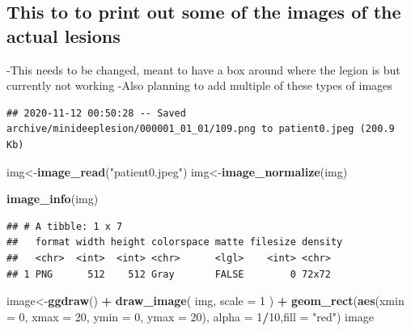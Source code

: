 \documentclass[12pt]{article}
\newenvironment{Shaded}{\begin{snugshade}}{\end{snugshade}}
\newcommand{\DataTypeTok}[1]{\textcolor[rgb]{0.13,0.29,0.53}{#1}}
\newcommand{\DecValTok}[1]{\textcolor[rgb]{0.00,0.00,0.81}{#1}}
\newcommand{\KeywordTok}[1]{\textcolor[rgb]{0.13,0.29,0.53}{\textbf{#1}}}
\newcommand{\NormalTok}[1]{#1}
\newcommand{\OperatorTok}[1]{\textcolor[rgb]{0.81,0.36,0.00}{\textbf{#1}}}
\newcommand{\OtherTok}[1]{\textcolor[rgb]{0.56,0.35,0.01}{#1}}
\newcommand{\StringTok}[1]{\textcolor[rgb]{0.31,0.60,0.02}{#1}}
\begin{document}
\hypertarget{this-to-to-print-out-some-of-the-images-of-the-actual-lesions}{%
\subsection{This to to print out some of the images of the actual
lesions}\label{this-to-to-print-out-some-of-the-images-of-the-actual-lesions}}

-This needs to be changed, meant to have a box around where the legion
is but currently not working -Also planning to add multiple of these
types of images

\begin{Shaded}
\end{Shaded}

\begin{verbatim}
## 2020-11-12 00:50:28 -- Saved archive/minideeplesion/000001_01_01/109.png to patient0.jpeg (200.9 Kb)
\end{verbatim}

\begin{Shaded}
\begin{Highlighting}[]
\NormalTok{img<-}\KeywordTok{image_read}\NormalTok{(}\StringTok{"patient0.jpeg"}\NormalTok{)}
\NormalTok{img<-}\KeywordTok{image_normalize}\NormalTok{(img)}

\KeywordTok{image_info}\NormalTok{(img)}
\end{Highlighting}
\end{Shaded}

\begin{verbatim}
## # A tibble: 1 x 7
##   format width height colorspace matte filesize density
##   <chr>  <int>  <int> <chr>      <lgl>    <int> <chr>  
## 1 PNG      512    512 Gray       FALSE        0 72x72
\end{verbatim}

\begin{Shaded}
\begin{Highlighting}[]
\NormalTok{image<-}\KeywordTok{ggdraw}\NormalTok{() }\OperatorTok{+}
\StringTok{  }\KeywordTok{draw_image}\NormalTok{(}
\NormalTok{    img, }\DataTypeTok{scale =} \DecValTok{1}
\NormalTok{  ) }\OperatorTok{+}\StringTok{ }\KeywordTok{geom_rect}\NormalTok{(}\KeywordTok{aes}\NormalTok{(}\DataTypeTok{xmin =} \DecValTok{0}\NormalTok{, }\DataTypeTok{xmax =} \DecValTok{20}\NormalTok{, }\DataTypeTok{ymin =} \DecValTok{0}\NormalTok{, }\DataTypeTok{ymax =} \DecValTok{20}\NormalTok{), }\DataTypeTok{alpha =} \DecValTok{1}\OperatorTok{/}\DecValTok{10}\NormalTok{,}\DataTypeTok{fill =} \StringTok{"red"}\NormalTok{)}
\NormalTok{image}
\end{Highlighting}
\end{Shaded}
\end{document}
